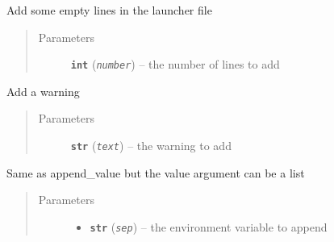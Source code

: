 \documentclass[a4paper,10pt,english]{sphinxmanual}
\begin{document}
\begin{fulllineitems}
\begin{fulllineitems}
\begin{quote}
\begin{description}
\end{description}\end{quote}

\end{fulllineitems}


\begin{fulllineitems}
\label{commands/apidoc/src:src.fileEnviron.LauncherFileEnviron.add_line}
Add some empty lines in the launcher file
\begin{quote}\begin{description}
\item[{Parameters}] \leavevmode
\textbf{\texttt{int}} (\emph{\texttt{number}}) -- the number of lines to add

\end{description}\end{quote}

\end{fulllineitems}


\begin{fulllineitems}
\label{commands/apidoc/src:src.fileEnviron.LauncherFileEnviron.add_warning}
Add a warning
\begin{quote}\begin{description}
\item[{Parameters}] \leavevmode
\textbf{\texttt{str}} (\emph{\texttt{text}}) -- the warning to add

\end{description}\end{quote}

\end{fulllineitems}


\begin{fulllineitems}
\label{commands/apidoc/src:src.fileEnviron.LauncherFileEnviron.append}
Same as append\_value but the value argument can be a list
\begin{quote}\begin{description}
\item[{Parameters}] \leavevmode\begin{itemize}
\item {} 
\textbf{\texttt{str}} (\emph{\texttt{sep}}) -- the environment variable to append


\end{itemize}
\end{description}
\end{quote}
\end{fulllineitems}
\end{fulllineitems}
\end{document}
